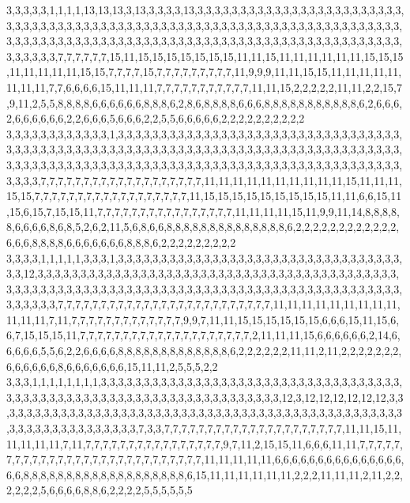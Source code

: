 3,3,3,3,3,1,1,1,1,13,13,13,3,13,3,3,3,3,13,3,3,3,3,3,3,3,3,3,3,3,3,3,3,3,3,3,3,3,3,3,3,3,3,3,3,3,3,3,3,3,3,3,3,3,3,3,3,3,3,3,3,3,3,3,3,3,3,3,3,3,3,3,3,3,3,3,3,3,3,3,3,3,3,3,3,3,3,3,3,3,3,3,3,3,3,3,3,3,3,3,3,3,3,3,3,3,3,3,3,3,3,3,3,3,3,3,3,3,3,3,3,3,3,3,3,3,3,3,3,3,3,3,3,3,3,3,3,3,3,3,3,7,7,7,7,7,7,15,11,15,15,15,15,15,15,15,11,11,15,11,11,11,11,11,11,15,15,15,11,11,11,11,11,15,15,7,7,7,7,15,7,7,7,7,7,7,7,7,7,11,9,9,9,11,11,15,15,11,11,11,11,11,11,11,11,7,7,6,6,6,6,15,11,11,11,7,7,7,7,7,7,7,7,7,7,7,11,11,15,2,2,2,2,2,11,11,2,2,15,7,9,11,2,5,5,8,8,8,8,6,6,6,6,6,6,8,8,8,6,2,8,6,8,8,8,8,6,6,6,8,8,8,8,8,8,8,8,8,8,8,6,2,6,6,6,2,6,6,6,6,6,6,2,2,6,6,6,5,6,6,6,2,2,5,5,6,6,6,6,6,2,2,2,2,2,2,2,2,2,2
3,3,3,3,3,3,3,3,3,3,3,3,1,3,3,3,3,3,3,3,3,3,3,3,3,3,3,3,3,3,3,3,3,3,3,3,3,3,3,3,3,3,3,3,3,3,3,3,3,3,3,3,3,3,3,3,3,3,3,3,3,3,3,3,3,3,3,3,3,3,3,3,3,3,3,3,3,3,3,3,3,3,3,3,3,3,3,3,3,3,3,3,3,3,3,3,3,3,3,3,3,3,3,3,3,3,3,3,3,3,3,3,3,3,3,3,3,3,3,3,3,3,3,3,3,3,3,3,3,3,3,3,3,3,3,3,3,3,3,3,3,3,7,7,7,7,7,7,7,7,7,7,7,7,7,7,7,7,7,7,7,11,11,11,11,11,11,11,11,11,11,15,11,11,11,15,15,7,7,7,7,7,7,7,7,7,7,7,7,7,7,7,7,7,7,11,15,15,15,15,15,15,15,15,15,11,11,6,6,15,11,15,6,15,7,15,15,11,7,7,7,7,7,7,7,7,7,7,7,7,7,7,7,7,11,11,11,11,15,11,9,9,11,14,8,8,8,8,8,6,6,6,6,8,6,8,5,2,6,2,11,5,6,8,6,6,8,8,8,8,8,8,8,8,8,8,8,8,8,8,6,2,2,2,2,2,2,2,2,2,2,2,2,6,6,6,8,8,8,8,6,6,6,6,6,6,6,8,8,8,6,2,2,2,2,2,2,2,2,2
3,3,3,3,1,1,1,1,1,3,3,3,1,3,3,3,3,3,3,3,3,3,3,3,3,3,3,3,3,3,3,3,3,3,3,3,3,3,3,3,3,3,3,3,3,3,3,3,12,3,3,3,3,3,3,3,3,3,3,3,3,3,3,3,3,3,3,3,3,3,3,3,3,3,3,3,3,3,3,3,3,3,3,3,3,3,3,3,3,3,3,3,3,3,3,3,3,3,3,3,3,3,3,3,3,3,3,3,3,3,3,3,3,3,3,3,3,3,3,3,3,3,3,3,3,3,3,3,3,3,3,3,3,3,3,3,3,3,3,3,3,3,3,7,7,7,7,7,7,7,7,7,7,7,7,7,7,7,7,7,7,7,7,7,7,7,7,7,11,11,11,11,11,11,11,11,11,11,11,11,7,11,7,7,7,7,7,7,7,7,7,7,7,7,7,9,9,7,11,11,15,15,15,15,15,15,6,6,6,15,11,15,6,6,7,15,15,15,11,7,7,7,7,7,7,7,7,7,7,7,7,7,7,7,7,7,7,7,7,2,11,11,11,15,6,6,6,6,6,6,2,14,6,6,6,6,6,5,5,6,2,2,6,6,6,6,8,8,8,8,8,8,8,8,8,8,8,8,8,6,2,2,2,2,2,2,11,11,2,11,2,2,2,2,2,2,2,6,6,6,6,6,6,8,6,6,6,6,6,6,6,15,11,11,2,5,5,5,2,2
3,3,3,1,1,1,1,1,1,1,1,3,3,3,3,3,3,3,3,3,3,3,3,3,3,3,3,3,3,3,3,3,3,3,3,3,3,3,3,3,3,3,3,3,3,3,3,3,3,3,3,3,3,3,3,3,3,3,3,3,3,3,3,3,3,3,3,3,3,3,3,3,3,3,3,3,3,3,12,3,12,12,12,12,12,12,3,3,3,3,3,3,3,3,3,3,3,3,3,3,3,3,3,3,3,3,3,3,3,3,3,3,3,3,3,3,3,3,3,3,3,3,3,3,3,3,3,3,3,3,3,3,3,3,3,3,3,3,3,3,3,3,3,3,3,3,3,3,3,7,3,3,7,7,7,7,7,7,7,7,7,7,7,7,7,7,7,7,7,7,7,7,7,11,11,15,11,11,11,11,11,7,11,7,7,7,7,7,7,7,7,7,7,7,7,7,7,7,7,9,7,11,2,15,15,11,6,6,6,11,11,7,7,7,7,7,7,7,7,7,7,7,7,7,7,7,7,7,7,7,7,7,7,7,7,7,7,7,7,11,11,11,11,11,6,6,6,6,6,6,6,6,6,6,6,6,6,6,6,6,6,8,8,8,8,8,8,8,8,8,8,8,8,8,8,8,8,8,8,8,6,15,11,11,11,11,11,11,2,2,2,11,11,11,2,11,2,2,2,2,2,2,5,6,6,6,6,8,8,6,2,2,2,2,5,5,5,5,5,5

